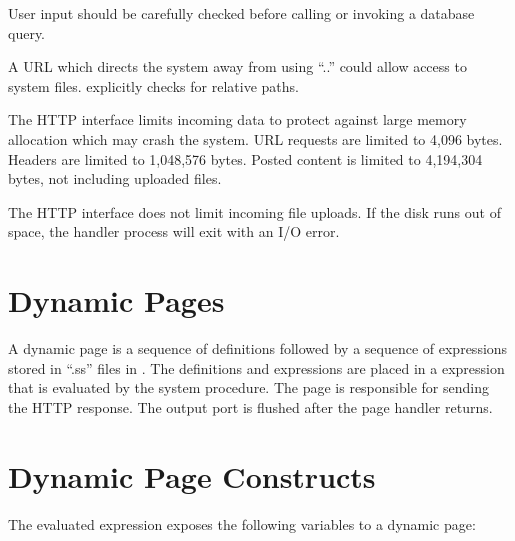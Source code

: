 User input should be carefully checked before calling  or
invoking a database query.

A URL which directs the system away from  using
``..'' could allow access to system files. 
explicitly checks for relative paths.

The HTTP interface limits incoming data to protect against large
memory allocation which may crash the system. URL requests are limited
to 4,096 bytes. Headers are limited to 1,048,576 bytes. Posted content
is limited to 4,194,304 bytes, not including uploaded files.

The HTTP interface does not limit incoming file uploads. If the disk
runs out of space, the handler process will exit with an I/O error.

\section {Dynamic Pages}

A dynamic page is a sequence of definitions followed by a sequence of
expressions stored in ``.ss'' files in .  The
definitions and expressions are placed in a  expression
that is evaluated by the  system procedure.  The
page is responsible for sending the HTTP response. The output port is
flushed after the page handler returns.

\section {Dynamic Page Constructs}

The evaluated  expression exposes the following
variables to a dynamic page:

\begin{argtbl}
\end{argtbl}

\begin{syntax}
\end{syntax}\antipar
{}

\begin{syntax}
\end{syntax}\antipar
{}

